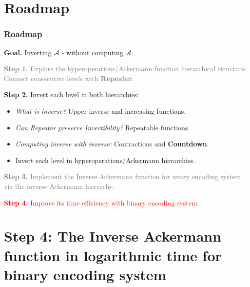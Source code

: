 \documentclass[10pt]{beamer}
\newcommand{\Ack}{\ensuremath{\mathcal{A}}}
\begin{document}
\section*{Roadmap}
\begin{frame}
\frametitle{Roadmap}
\textbf{Goal.} Inverting $\Ack$ - without computing $\Ack$.

\bigskip

\textcolor<1-2>{gray}{\textbf{Step 1.} Explore the hyperoperations/Ackermann function hierarchical structure: Connect consecutive levels with \textbf{Repeater}.}

\bigskip

{ \textbf{Step 2.} Invert each level in both hierarchies:
	{ \small
		\begin{itemize}\itemsep0em
			\color<1-2>{gray}
			\item \emph{What is inverse?} Upper inverse and increasing functions.
			\item \emph{Can Repeater preserve Invertibility?} Repeatable functions.
			\item \emph{Computing inverse with inverse:} Contractions and \textbf{Countdown}.
			\item Invert each level in hyperoperations/Ackermann hierarchies.
		\end{itemize}
	}
}

\bigskip

\textcolor<1-2>{gray}{\textbf{Step 3.} Implement the Inverse Ackermann function for unary encoding system via the inverse Ackermann hierarchy.}

\bigskip

\textcolor<2>{red}{\textbf{Step 4.} Improve its time efficiency with binary encoding system.}
\end{frame}


\section{Step 4: The Inverse Ackermann function in logarithmic time for binary encoding system}
\label{sec: binary}

\end{document}
